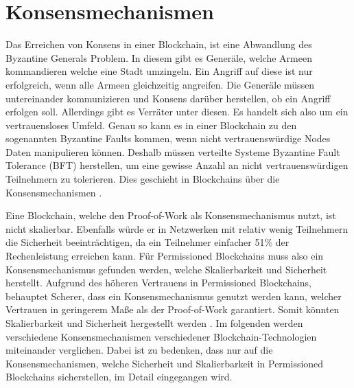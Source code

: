 
\label{subsec:eval-konsens}
\section{Konsensmechanismen}
Das Erreichen von Konsens in einer Blockchain, ist eine Abwandlung des Byzantine Generals Problem. In diesem gibt es Generäle, welche Armeen kommandieren welche eine Stadt umzingeln. Ein Angriff auf diese ist nur erfolgreich, wenn alle Armeen gleichzeitig angreifen. Die Generäle müssen untereinander kommunizieren und Konsens darüber herstellen, ob ein Angriff erfolgen soll. Allerdings gibt es Verräter unter diesen. Es handelt sich also um ein vertrauensloses Umfeld. Genau so kann es in einer Blockchain zu den sogenannten Byzantine Faults kommen, wenn nicht vertrauenswürdige Nodes Daten manipulieren können. Deshalb müssen verteilte Systeme Byzantine Fault Tolerance (BFT) herstellen, um eine gewisse Anzahl an nicht vertrauenswürdigen Teilnehmern zu tolerieren. Dies geschieht in Blockchains über die Konsensmechanismen \cite{ZhengBlockchainChallengesOpportunities2017} \cite{ByzantineFaultTolerance2017}.

Eine Blockchain, welche den Proof-of-Work als Konsensmechanismus nutzt, ist nicht skalierbar. Ebenfalls würde er in Netzwerken mit relativ wenig Teilnehmern die Sicherheit beeinträchtigen, da ein Teilnehmer einfacher 51\% der Rechenleistung erreichen kann. Für Permissioned Blockchains muss also ein Konsensmechanismus gefunden werden, welche Skalierbarkeit und Sicherheit herstellt. Aufgrund des höheren Vertrauens in Permissioned Blockchains, behauptet Scherer, dass ein Konsensmechanismus genutzt werden kann, welcher Vertrauen in geringerem Maße als der Proof-of-Work garantiert. Somit könnten Skalierbarkeit und Sicherheit hergestellt werden \cite{SchererPerformanceScalabilityBlockchain2017}. Im folgenden werden verschiedene Konsensmechanismen verschiedener Blockchain-Technologien miteinander verglichen. Dabei ist zu bedenken, dass nur auf die Konsensmechanismen, welche Sicherheit und Skalierbarkeit in Permissioned Blockchains sicherstellen, im Detail eingegangen wird.



